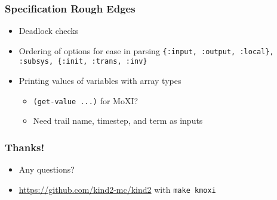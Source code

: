 \documentclass[11pt,xcolor={dvipsnames},hyperref={pdftex,pdfpagemode=UseNone,hidelinks,pdfdisplaydoctitle=true},usepdftitle=false]{beamer}
\newcommand{\code}[1]{{\footnotesize\texttt{#1}}}
\begin{document}
\begin{frame}
    \frametitle{Specification Rough Edges}
    \begin{itemize}
        \item Deadlock checks \pause
        \item Ordering of options for ease in parsing\pause\newline 
        \code{\{:input, :output, :local\}, \newline :subsys, \newline \{:init, :trans, :inv\}} \pause
        \item Printing values of variables with array types\pause
        \begin{itemize}
            \item \code{(get-value ...)} for MoXI?
            \item Need trail name, timestep, and term as inputs
        \end{itemize}
    \end{itemize}
\end{frame}

\begin{frame}
    \frametitle{Thanks!}
    \begin{itemize}
        \item Any questions?
        \item \footnotesize{\url{https://github.com/kind2-mc/kind2}} \newline with \code{make kmoxi}
    \end{itemize}
\end{frame} 
\end{document}
